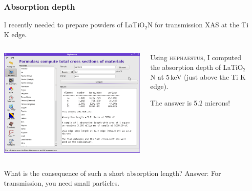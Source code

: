 \documentclass[10pt, xcolor=x11names, compress]{beamer}
\begin{document}
\begin{frame}
  \frametitle{Absorption depth}
  
  I recently needed to prepare powders of LaTiO$_2$N for
  transmission XAS at the Ti K edge.

  \smallskip

  \begin{columns}
    \begin{column}{0.6\linewidth}
      \includegraphics[width=0.9\linewidth]{sample/heph_formula.png}
    \end{column}
    \begin{column}{0.4\linewidth}
      Using \textsc{hephaestus}, I computed the absorption depth of
      LaTiO$_2$N at 5\,keV (just above the Ti K edge).

      \medskip

      The answer is \alert{5.2 microns}!
    \end{column}
  \end{columns}

  \begin{alertblock}{What is the consequence of such a short
      absorption length?}
    Answer: For transmission, you need {\tiny small} particles.
  \end{alertblock}
\end{frame}
\end{document}
